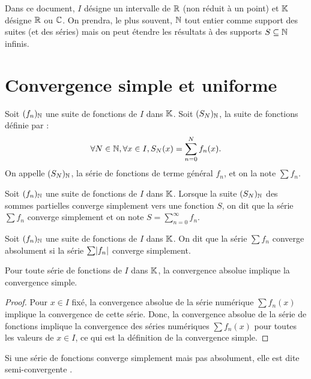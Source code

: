 \documentclass[french]{article}
\begin{document}
Dans ce document, $I$ désigne un intervalle de $\mathbb{R}$ (non réduit à un point) et $\mathbb{K}$ désigne $\mathbb{R}$ ou $\mathbb{C}$.
On prendra, le plus souvent, $\mathbb{N}$ tout entier comme support des suites (et des séries) mais on peut étendre les résultats à des supports 
$S \subseteq \mathbb{N}$ infinis.

\section{Convergence simple et uniforme}

\begin{defn}
Soit $(f_n)_{\mathbb{N}}$ une suite de fonctions de $I$ dans $\mathbb{K}$.
Soit $(S_N)_{\mathbb{N}}$, la suite de fonctions définie par :
\[ \forall N \in \mathbb{N}, \forall x \in I, S_N(x) = \sum_{n=0}^N f_n(x) . \]
On appelle $(S_N)_{\mathbb{N}}$, la série de fonctions de terme général $f_n$, et on la note $\sum f_n$.
\end{defn}

\begin{defn}
Soit $(f_n)_{\mathbb{N}}$ une suite de fonctions de $I$ dans $\mathbb{K}$.
Lorsque la suite $(S_N)_{\mathbb{N}}$ des sommes partielles converge simplement vers une fonction $S$, on dit que la série $\sum f_n$ converge 
simplement et on note $S = \sum_{n=0}^{\infty}f_n$.
\end{defn}

\begin{defn}
Soit $(f_n)_{\mathbb{N}}$ une suite de fonctions de $I$ dans $\mathbb{K}$.
On dit que la série $\sum f_n$ converge absolument si la série $\sum \lvert f_n\rvert$ converge simplement.
\end{defn}

\begin{thm}
Pour toute série de fonctions de $I$ dans $\mathbb{K}$, la convergence absolue implique la convergence simple.
\end{thm}

\begin{proof}
Pour $x \in I$ fixé, la convergence absolue de la série numérique $\sum f_n(x)$ implique la convergence de cette série.
Donc, la convergence absolue de la série de fonctions implique la convergence des séries numériques $\sum f_n(x)$ pour toutes les
valeurs de $x \in I$, ce qui est la définition de la convergence simple.
\end{proof}

\begin{rmq}
Si une série de fonctions converge simplement mais pas absolument, elle est dite \og semi-convergente \fg.
\end{rmq}
\end{document}
